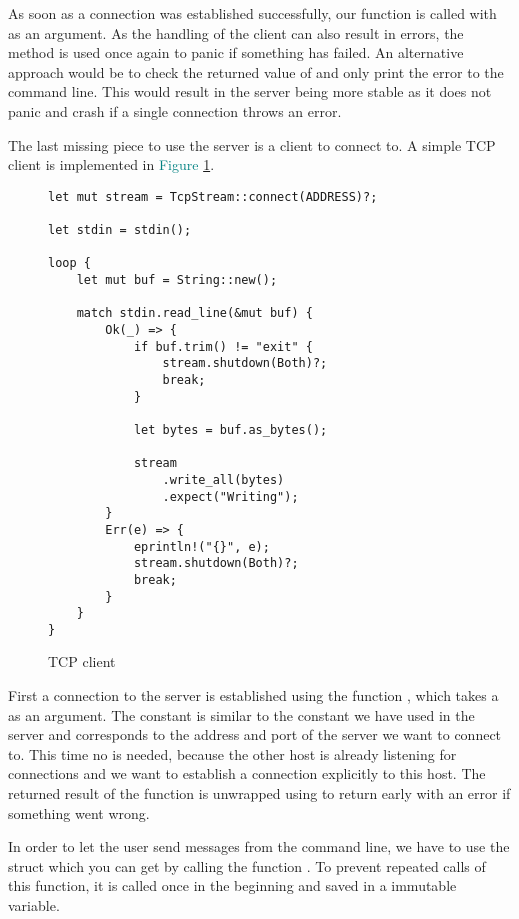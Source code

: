 As soon as a connection was established successfully, our function  is called with  as
an argument. As the handling of the client can also result in errors, the  method is used once again to
panic if something has failed. An alternative approach would be to check the returned value of  and
only print the error to the command line. This would result in the server being more stable as it does not panic and
crash if a single connection throws an error.

The last missing piece to use the server is a client to connect to. A simple TCP client is implemented in
\textcolor{teal}{Figure \ref{tcp-client}}.

\begin{figure}[ht]
    \begin{verbatim}
let mut stream = TcpStream::connect(ADDRESS)?;

let stdin = stdin();

loop {
    let mut buf = String::new();

    match stdin.read_line(&mut buf) {
        Ok(_) => {
            if buf.trim() != "exit" {
                stream.shutdown(Both)?;
                break;
            }

            let bytes = buf.as_bytes();

            stream
                .write_all(bytes)
                .expect("Writing");
        }
        Err(e) => {
            eprintln!("{}", e);
            stream.shutdown(Both)?;
            break;
        }
    }
}
    \end{verbatim}
    \caption{TCP client}
    \label{tcp-client}
\end{figure}

First a connection to the server is established using the function , which takes a 
 as an argument. The constant  is similar to the constant we have used in the server and
corresponds to the address and port of the server we want to connect to. This time no  is needed,
because the other host is already listening for connections and we want to establish a connection explicitly to this
host. The returned result of the function is unwrapped using  to return early with an error if something went
wrong.

In order to let the user send messages from the command line, we have to use the struct  which you
can get by calling the function . To prevent repeated calls of this function, it is called once in
the beginning and saved in a immutable variable.


